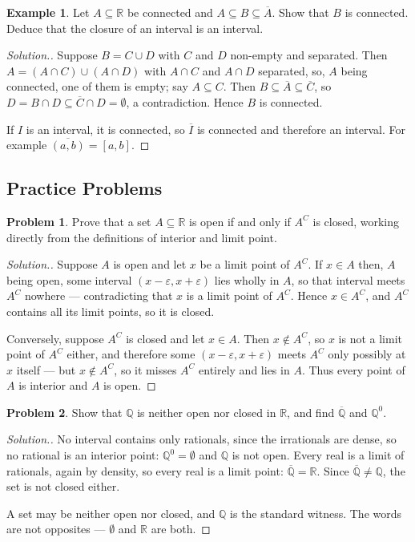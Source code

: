 \documentclass[11pt,a4paper]{article}
\numberwithin{equation}{section}
\theoremstyle{definition}
\newtheorem{exa}[thm]{Example}
\newtheorem{problemx}{Problem}[subsection]
\newenvironment{problem}{\begin{problemx}}{\end{problemx}}
\newenvironment{solution}
  {\renewcommand{\qedsymbol}{}\begin{proof}[\textit{Solution}.]}
  {\end{proof}}
\begin{document}
\begin{exa}
Let $A\subseteq\mathbb{R}$ be connected and $A\subseteq B\subseteq\overline{A}$. Show that $B$ is connected. Deduce that the closure of an interval is an interval.
\end{exa}

\begin{solution}
Suppose $B = C\cup D$ with $C$ and $D$ non-empty and separated. Then $A = (A\cap C)\cup(A\cap D)$ with $A\cap C$ and $A\cap D$ separated, so, $A$ being connected, one of them is empty; say $A\subseteq C$. Then $B\subseteq\overline{A}\subseteq\overline{C}$, so $D = B\cap D\subseteq\overline{C}\cap D = \emptyset$, a contradiction. Hence $B$ is connected.

If $I$ is an interval, it is connected, so $\overline{I}$ is connected and therefore an interval. For example $\overline{(a,b)} = [a,b]$.
\end{solution}


\subsection{Practice Problems}

\begin{problem}
Prove that a set $A\subseteq\mathbb{R}$ is open if and only if $A^{C}$ is
closed, working directly from the definitions of interior and limit point.
\end{problem}
\begin{solution}
Suppose $A$ is open and let $x$ be a limit point of $A^{C}$. If $x\in A$ then,
$A$ being open, some interval $(x-\varepsilon,x+\varepsilon)$ lies wholly in
$A$, so that interval meets $A^{C}$ nowhere --- contradicting that $x$ is a
limit point of $A^{C}$. Hence $x\in A^{C}$, and $A^{C}$ contains all its limit
points, so it is closed.

Conversely, suppose $A^{C}$ is closed and let $x\in A$. Then $x\notin A^{C}$, so
$x$ is not a limit point of $A^{C}$ either, and therefore some
$(x-\varepsilon,x+\varepsilon)$ meets $A^{C}$ only possibly at $x$ itself ---
but $x\notin A^{C}$, so it misses $A^{C}$ entirely and lies in $A$. Thus every
point of $A$ is interior and $A$ is open.
\end{solution}

\begin{problem}
Show that $\mathbb{Q}$ is neither open nor closed in $\mathbb{R}$, and find
$\overline{\mathbb{Q}}$ and $\mathbb{Q}^{0}$.
\end{problem}
\begin{solution}
No interval contains only rationals, since the irrationals are dense, so no
rational is an interior point: $\mathbb{Q}^{0}=\emptyset$ and $\mathbb{Q}$ is
not open. Every real is a limit of rationals, again by density, so every real is
a limit point: $\overline{\mathbb{Q}} = \mathbb{R}$. Since
$\overline{\mathbb{Q}}\neq\mathbb{Q}$, the set is not closed either.

A set may be neither open nor closed, and $\mathbb{Q}$ is the standard witness.
The words are not opposites --- $\emptyset$ and $\mathbb{R}$ are both.
\end{solution}
\end{document}
